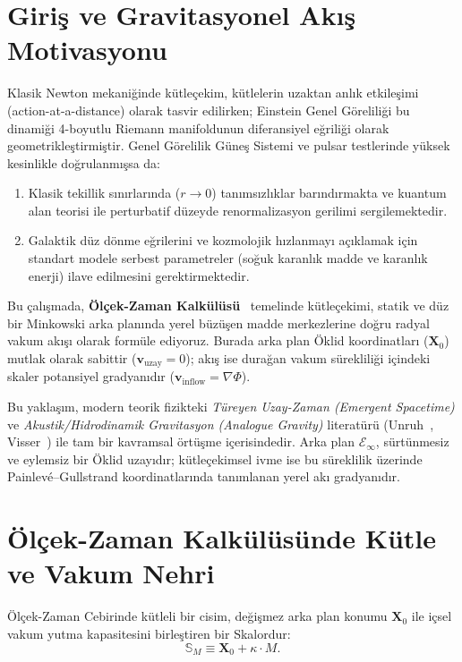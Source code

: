 \documentclass[11pt,a4paper]{article}
\begin{document}
\section{Giriş ve Gravitasyonel Akış Motivasyonu}
\label{sec:giris}

Klasik Newton mekaniğinde kütleçekim, kütlelerin uzaktan anlık etkileşimi (action-at-a-distance) olarak tasvir edilirken; Einstein Genel Göreliliği bu dinamiği 4-boyutlu Riemann manifoldunun diferansiyel eğriliği olarak geometrikleştirmiştir. Genel Görelilik Güneş Sistemi ve pulsar testlerinde yüksek kesinlikle doğrulanmışsa da:
\begin{enumerate}
    \item Klasik tekillik sınırlarında ($r \to 0$) tanımsızlıklar barındırmakta ve kuantum alan teorisi ile perturbatif düzeyde renormalizasyon gerilimi sergilemektedir.
    \item Galaktik düz dönme eğrilerini ve kozmolojik hızlanmayı açıklamak için standart modele serbest parametreler (soğuk karanlık madde ve karanlık enerji) ilave edilmesini gerektirmektedir.
\end{enumerate}

Bu çalışmada, \textbf{Ölçek-Zaman Kalkülüsü}~\cite{scale_calculus} temelinde kütleçekimi, statik ve düz bir Minkowski arka planında yerel büzüşen madde merkezlerine doğru radyal vakum akışı olarak formüle ediyoruz. Burada arka plan Öklid koordinatları ($\mathbf{X}_0$) mutlak olarak sabittir ($\mathbf{v}_{\mathrm{uzay}} = 0$); akış ise durağan vakum sürekliliği içindeki skaler potansiyel gradyanıdır ($\mathbf{v}_{\mathrm{inflow}} = \nabla \Phi$).

Bu yaklaşım, modern teorik fizikteki \textit{Türeyen Uzay-Zaman (Emergent Spacetime)} ve \textit{Akustik/Hidrodinamik Gravitasyon (Analogue Gravity)} literatürü (Unruh~\cite{unruh1981}, Visser~\cite{visser1998}) ile tam bir kavramsal örtüşme içerisindedir. Arka plan $\mathcal{E}_\infty$, sürtünmesiz ve eylemsiz bir Öklid uzayıdır; kütleçekimsel ivme ise bu süreklilik üzerinde Painlev\'e--Gullstrand koordinatlarında tanımlanan yerel akı gradyanıdır.

\section{Ölçek-Zaman Kalkülüsünde Kütle ve Vakum Nehri}
\label{sec:nehir_modeli}

Ölçek-Zaman Cebirinde kütleli bir cisim, değişmez arka plan konumu $\mathbf{X}_0$ ile içsel vakum yutma kapasitesini birleştiren bir Skalordur:
\begin{equation}
    \mathbb{S}_M \equiv \mathbf{X}_0 + \kappa \cdot M.
    \label{eq:skalor_kutle}
\end{equation}
\end{document}
